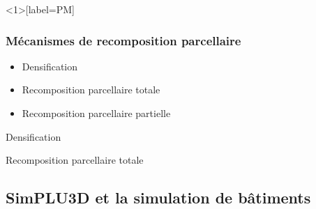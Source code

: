 \documentclass[xcolor=table]{beamer}
\begin{document}
\begin{frame}<1>[label=PM]
	\frametitle{Mécanismes de recomposition parcellaire}
	\begin{itemize}
		\item \alert<1>{Densification}
		\item \alert<2>{Recomposition parcellaire totale}
		\item \alert<2>{Recomposition parcellaire partielle}
	\end{itemize}
\end{frame}

\begin{frame}{Densification}
\end{frame}


\begin{frame}{Recomposition parcellaire totale}
\end{frame}


\subsection[SimPLU3D]{SimPLU3D et la simulation de bâtiments}
\begin{frame}
\subsectionpage
\end{frame}
\end{document}
